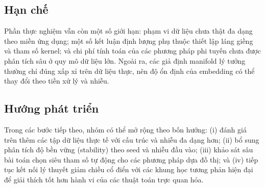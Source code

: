\subsection{Hạn chế}

Phần thực nghiệm vẫn còn một số giới hạn: phạm vi dữ liệu chưa thật đa dạng theo miền ứng dụng; một số kết luận định lượng phụ thuộc thiết lập láng giềng và tham số kernel; và chi phí tính toán của các phương pháp phi tuyến chưa được phân tích sâu ở quy mô dữ liệu lớn. Ngoài ra, các giả định manifold lý tưởng thường chỉ đúng xấp xỉ trên dữ liệu thực, nên độ ổn định của embedding có thể thay đổi theo tiền xử lý và nhiễu.

\subsection{Hướng phát triển}

Trong các bước tiếp theo, nhóm có thể mở rộng theo bốn hướng: (i) đánh giá trên thêm các tập dữ liệu thực tế với cấu trúc và nhiễu đa dạng hơn; (ii) bổ sung phân tích độ bền vững (stability) theo seed và nhiễu đầu vào; (iii) khảo sát sâu bài toán chọn siêu tham số tự động cho các phương pháp dựa đồ thị; và (iv) tiếp tục kết nối lý thuyết giảm chiều cổ điển với các khung học tương phản hiện đại để giải thích tốt hơn hành vi của các thuật toán trực quan hóa.
